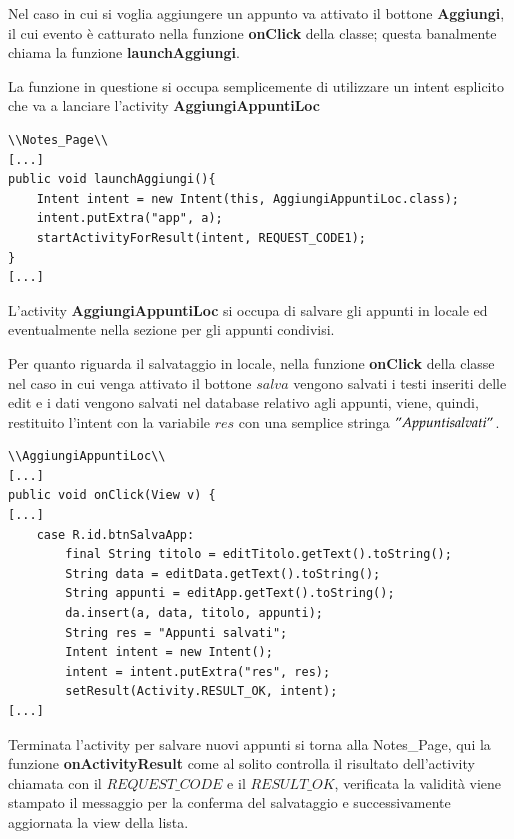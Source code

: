\documentclass[a4paper, 50pt, twoside]{article}
\begin{document}
Nel caso in cui si voglia aggiungere un appunto va attivato il bottone \textbf{Aggiungi}, il cui evento è catturato nella funzione \textbf{onClick} della classe; questa banalmente chiama la funzione \textbf{launchAggiungi}.

La funzione in questione si occupa semplicemente di utilizzare un intent esplicito che va a lanciare l'activity \textbf{AggiungiAppuntiLoc}

\begin{lstlisting}
\\Notes_Page\\
[...]
public void launchAggiungi(){
	Intent intent = new Intent(this, AggiungiAppuntiLoc.class);
	intent.putExtra("app", a);
	startActivityForResult(intent, REQUEST_CODE1);
}
[...]
\end{lstlisting}

L'activity \textbf{AggiungiAppuntiLoc} si occupa di salvare gli appunti in locale ed eventualmente nella sezione per gli appunti condivisi.

Per quanto riguarda il salvataggio in locale, nella funzione \textbf{onClick} della classe nel caso in cui venga attivato il bottone $salva$ vengono salvati i testi inseriti delle edit e i dati vengono salvati nel database relativo agli appunti, viene, quindi, restituito l'intent con la variabile $res$ con una semplice stringa $"Appunti salvati"$.

\begin{lstlisting}
\\AggiungiAppuntiLoc\\
[...]
public void onClick(View v) {
[...]
	case R.id.btnSalvaApp:
		final String titolo = editTitolo.getText().toString();
		String data = editData.getText().toString();
		String appunti = editApp.getText().toString();
		da.insert(a, data, titolo, appunti);
		String res = "Appunti salvati";
		Intent intent = new Intent();
		intent = intent.putExtra("res", res);
		setResult(Activity.RESULT_OK, intent);
[...]
\end{lstlisting}

Terminata l'activity per salvare nuovi appunti si torna alla Notes\_Page, qui la funzione \textbf{onActivityResult} come al solito controlla il risultato dell'activity chiamata con il $REQUEST\_CODE$ e il $RESULT\_OK$, verificata la validità viene stampato il messaggio per la conferma del salvataggio e successivamente aggiornata la view della lista.
\end{document}
